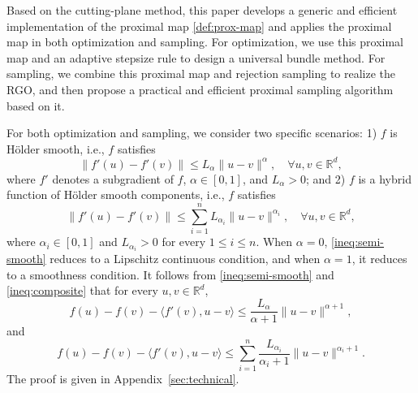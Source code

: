 \documentclass[11pt,letterpaper]{article}
\newcommand{\R}{\mathbb{R}}
\newcommand{\inner}[2]{\langle #1,#2\rangle}
\begin{document}
Based on the cutting-plane method, this paper develops a generic and efficient implementation of the proximal map \eqref{def:prox-map} and applies the proximal map in both optimization and sampling. For optimization, we use this proximal map and an adaptive stepsize rule to design a universal bundle method. For sampling, we combine this proximal map and rejection sampling to realize the RGO, and then propose a practical and efficient proximal sampling algorithm based on it.



For both optimization and sampling, we consider two specific scenarios: 1) $f$ is Hölder smooth, i.e., $f$ satisfies 
\begin{equation}\label{ineq:semi-smooth}
    \|f'(u) - f'(v)\| \le L_\alpha\|u-v\|^\alpha,\quad \forall u, v\in \R^d,
    \end{equation}
where $f'$ denotes a subgradient of $f$, $\alpha \in [0,1]$,  and $L_\alpha>0$; and 2) $f$ is a hybrid function of Hölder smooth components, i.e., $f$ satisfies 
    \begin{equation}\label{ineq:composite}
    \|f'(u) - f'(v)\| \le \sum_{i=1}^n L_{\alpha_i}\|u-v\|^{\alpha_i},\quad \forall u, v\in \R^d,
    \end{equation}
where $\alpha_i \in [0,1]$ and $L_{\alpha_i}>0$ for every $1\le i \le n$.
When $\alpha=0$, \eqref{ineq:semi-smooth} reduces to a Lipschitz continuous condition, and when $\alpha=1$, it reduces to a smoothness condition.
It follows from \eqref{ineq:semi-smooth} and \eqref{ineq:composite} that for every $u,v \in \R^d$,
\begin{equation}\label{ineq:semi}
    f(u) - f(v) - \inner{f'(v)}{u-v} \le \frac{L_\alpha}{\alpha+1} \|u-v\|^{\alpha+1},
\end{equation}
and
\begin{equation}\label{ineq:hybrid}
    f(u) - f(v) - \inner{f'(v)}{u-v} \le \sum_{i=1}^n \frac{L_{\alpha_i}}{\alpha_i+1} \|u-v\|^{\alpha_i+1}.
\end{equation}
The proof is given in Appendix~\ref{sec:technical}.
\end{document}
